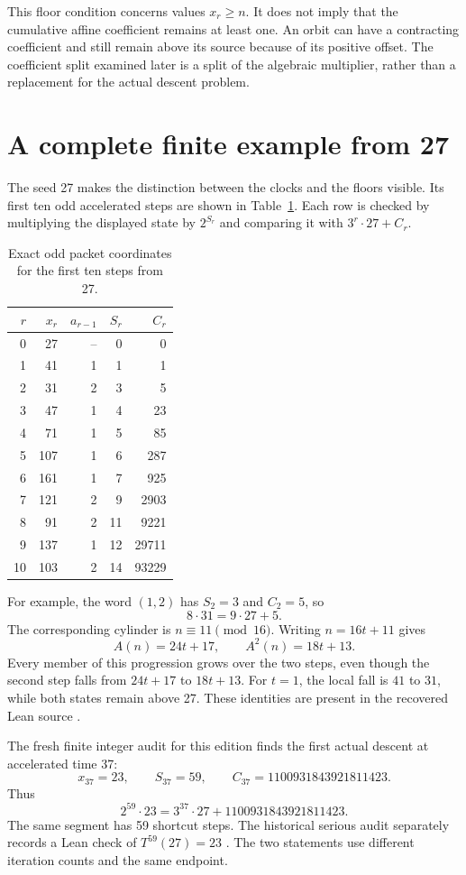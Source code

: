 This floor condition concerns values $x_r\ge n$. It does not imply that the cumulative affine coefficient remains at least one. An orbit can have a contracting coefficient and still remain above its source because of its positive offset. The coefficient split examined later is a split of the algebraic multiplier, rather than a replacement for the actual descent problem.

\section{A complete finite example from 27}
The seed 27 makes the distinction between the clocks and the floors visible. Its first ten odd accelerated steps are shown in Table~\ref{tab:27}. Each row is checked by multiplying the displayed state by $2^{S_r}$ and comparing it with $3^r\cdot27+C_r$.

\begin{table}[htbp]\centering
\caption{Exact odd packet coordinates for the first ten steps from 27.}\label{tab:27}
\begin{tabular}{rrrrr}\toprule
$r$&$x_r$&$a_{r-1}$&$S_r$&$C_r$\\\midrule
0&27&--&0&0\\
1&41&1&1&1\\
2&31&2&3&5\\
3&47&1&4&23\\
4&71&1&5&85\\
5&107&1&6&287\\
6&161&1&7&925\\
7&121&2&9&2903\\
8&91&2&11&9221\\
9&137&1&12&29711\\
10&103&2&14&93229\\\bottomrule
\end{tabular}
\end{table}

For example, the word $(1,2)$ has $S_2=3$ and $C_2=5$, so
\[
8\cdot31=9\cdot27+5.
\]
The corresponding cylinder is $n\equiv11\pmod{16}$. Writing $n=16t+11$ gives
\[
A(n)=24t+17,\qquad A^2(n)=18t+13.
\]
Every member of this progression grows over the two steps, even though the second step falls from $24t+17$ to $18t+13$. For $t=1$, the local fall is $41$ to $31$, while both states remain above 27. These identities are present in the recovered Lean source \cite{projectcollatzcore}.

The fresh finite integer audit for this edition finds the first actual descent at accelerated time 37:
\begin{equation}\label{eq:27descent}
x_{37}=23,\qquad S_{37}=59,\qquad
C_{37}=1100931843921811423.
\end{equation}
Thus
\[
2^{59}\cdot23=3^{37}\cdot27+1100931843921811423.
\]
The same segment has 59 shortcut steps. The historical serious audit separately records a Lean check of $T^{59}(27)=23$ \cite{projectcollatzaudit}. The two statements use different iteration counts and the same endpoint.

